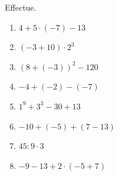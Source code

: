 %
%
	Effectue.
	\begin{enumerate}[cols=2, itemsep=.2cm]
		\item \(4+5\cdot (-7)-13\)
		\item \(\left(-3+10\right)\cdot 2^3\)
		\item \(\left(8+(-3)\right)^2 - 120\)
		\item \(-4+(-2)-(-7)\)
		\item \(1^9 + 3^3 - 30 + 13\)
		\item \(-10+(-5) + \left(7-13\right)\)
		\item \(45:9\cdot 3 \)
		\item \(-9-13+2\cdot (-5+7)\)
	\end{enumerate}	
